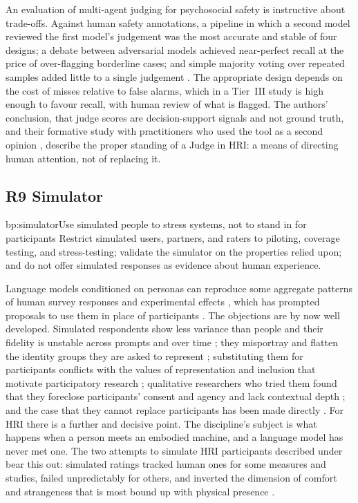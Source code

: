 An evaluation of multi-agent judging for psychosocial safety is instructive
about trade-offs. Against human safety annotations, a pipeline in which a
second model reviewed the first model's judgement was the most accurate and
stable of four designs; a debate between adversarial models achieved
near-perfect recall at the price of over-flagging borderline cases; and
simple majority voting over repeated samples added little to a single
judgement \cite{luo2025dialogguard}. The appropriate design depends on the
cost of misses relative to false alarms, which in a Tier~III study is high
enough to favour recall, with human review of what is flagged. The authors'
conclusion, that judge scores are decision-support signals and not ground
truth, and their formative study with practitioners who used the tool as a
second opinion \cite{luo2026dialogguard}, describe the proper standing of a
Judge in HRI: a means of directing human attention, not of replacing it.

\subsection{R9 Simulator}

\begin{practice}{bp:simulator}{Use simulated people to stress systems, not to stand in for participants}
Restrict simulated users, partners, and raters to piloting, coverage testing,
and stress-testing; validate the simulator on the properties relied upon; and
do not offer simulated responses as evidence about human experience.
\end{practice}

Language models conditioned on personas can reproduce some aggregate patterns
of human survey responses and experimental effects
\cite{argyle2023out,aher2023using}, which has prompted proposals to use them
in place of participants \cite{dillion2023can}. The objections are by now
well developed. Simulated respondents show less variance than people and
their fidelity is unstable across prompts and over time
\cite{bisbee2024synthetic}; they misportray and flatten the identity groups
they are asked to represent \cite{wang2025large}; substituting them for
participants conflicts with the values of representation and inclusion that
motivate participatory research \cite{agnew2024illusion}; qualitative
researchers who tried them found that they foreclose participants' consent
and agency and lack contextual depth \cite{kapania2025simulacrum}; and the
case that they cannot replace participants has been made directly
\cite{harding2024ai}. For HRI there is a further and decisive point. The
discipline's subject is what happens when a person meets an embodied
machine, and a language model has never met one. The two attempts to
simulate HRI participants described under  bear this out:
simulated ratings tracked human ones for some measures and studies, failed
unpredictably for others, and inverted the dimension of comfort and
strangeness that is most bound up with physical presence
\cite{wachowiak2024large,lockwood2026when}.

